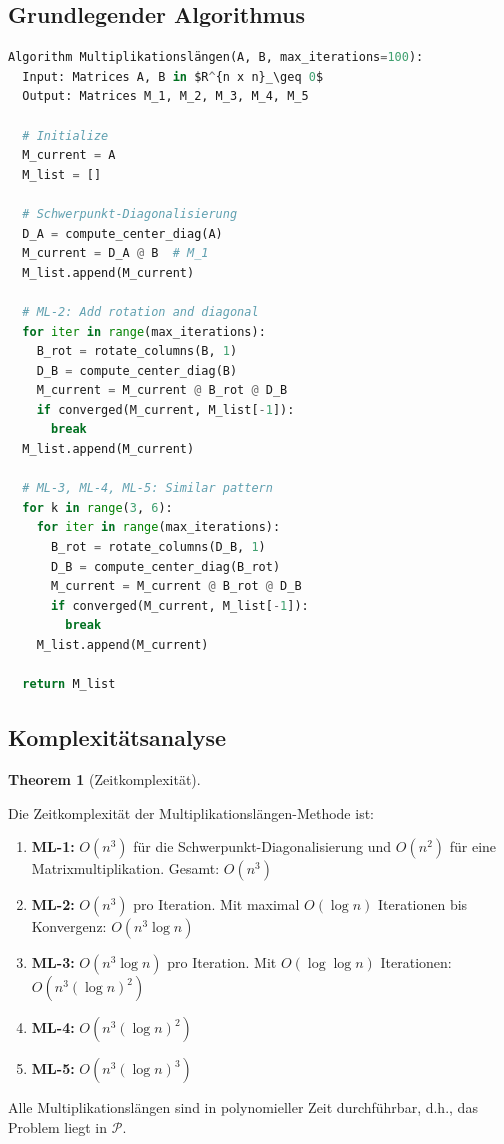 \documentclass[a4paper,12pt]{article}
\theoremstyle{definition}
\newtheorem{theorem}{Theorem}
\begin{document}
\subsection{Grundlegender Algorithmus}

\begin{lstlisting}[language=Python, caption=Multiplikationslängen-Berechnung (Pseudo-Code)]
Algorithm Multiplikationslängen(A, B, max_iterations=100):
  Input: Matrices A, B in $R^{n x n}_\geq 0$
  Output: Matrices M_1, M_2, M_3, M_4, M_5
  
  # Initialize
  M_current = A
  M_list = []
  
  # Schwerpunkt-Diagonalisierung
  D_A = compute_center_diag(A)
  M_current = D_A @ B  # M_1
  M_list.append(M_current)
  
  # ML-2: Add rotation and diagonal
  for iter in range(max_iterations):
    B_rot = rotate_columns(B, 1)
    D_B = compute_center_diag(B)
    M_current = M_current @ B_rot @ D_B
    if converged(M_current, M_list[-1]):
      break
  M_list.append(M_current)
  
  # ML-3, ML-4, ML-5: Similar pattern
  for k in range(3, 6):
    for iter in range(max_iterations):
      B_rot = rotate_columns(D_B, 1)
      D_B = compute_center_diag(B_rot)
      M_current = M_current @ B_rot @ D_B
      if converged(M_current, M_list[-1]):
        break
    M_list.append(M_current)
  
  return M_list
\end{lstlisting}

\subsection{Komplexitätsanalyse}

\begin{theorem}[Zeitkomplexität]
\label{thm:complexity}

Die Zeitkomplexität der Multiplikationslängen-Methode ist:

\begin{enumerate}

\item \textbf{ML-1:} $O(n^3)$ für die Schwerpunkt-Diagonalisierung und $O(n^2)$ für eine Matrixmultiplikation. Gesamt: $O(n^3)$

\item \textbf{ML-2:} $O(n^3)$ pro Iteration. Mit maximal $O(\log n)$ Iterationen bis Konvergenz: $O(n^3 \log n)$

\item \textbf{ML-3:} $O(n^3 \log n)$ pro Iteration. Mit $O(\log \log n)$ Iterationen: $O(n^3 (\log n)^2)$

\item \textbf{ML-4:} $O(n^3 (\log n)^2)$

\item \textbf{ML-5:} $O(n^3 (\log n)^3)$

\end{enumerate}

Alle Multiplikationslängen sind in polynomieller Zeit durchführbar, d.h., das Problem liegt in $\mathcal{P}$.

\end{theorem}
\end{document}

